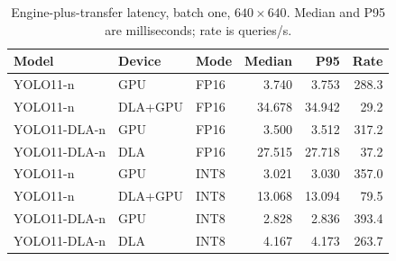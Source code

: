 \begin{table}[t]
\caption{Engine-plus-transfer latency, batch one, $640\times640$. Median and P95 are milliseconds; rate is queries/s.}
\label{tab:engine}\centering\footnotesize
\setlength{\tabcolsep}{3pt}
\begin{tabular*}{\columnwidth}{@{\extracolsep{\fill}}lllrrr@{}}
\toprule
Model & Device & Mode & Median & P95 & Rate \\
\midrule
YOLO11-n & GPU & FP16 & 3.740 & 3.753 & 288.3 \\
YOLO11-n & DLA+GPU & FP16 & 34.678 & 34.942 & 29.2 \\
YOLO11-DLA-n & GPU & FP16 & 3.500 & 3.512 & 317.2 \\
YOLO11-DLA-n & DLA & FP16 & 27.515 & 27.718 & 37.2 \\
\midrule
YOLO11-n & GPU & INT8 & 3.021 & 3.030 & 357.0 \\
YOLO11-n & DLA+GPU & INT8 & 13.068 & 13.094 & 79.5 \\
YOLO11-DLA-n & GPU & INT8 & 2.828 & 2.836 & 393.4 \\
YOLO11-DLA-n & DLA & INT8 & 4.167 & 4.173 & 263.7 \\
\bottomrule
\end{tabular*}
\end{table}

